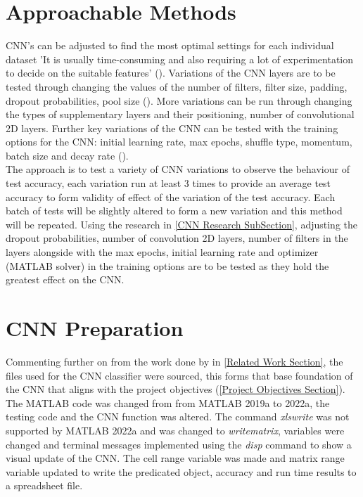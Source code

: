 \section{Approachable Methods}
\label{Approachable Methods Section}

CNN's can be adjusted to find the most optimal settings for each individual dataset 'It is usually time-consuming and also requiring a lot of experimentation to decide on the suitable features' (\cite{PalaniPaper}). Variations of the CNN layers are to be tested through changing the values of the number of filters, filter size, padding, dropout probabilities, pool size (\cite{layers}). More variations can be run through changing the types of supplementary layers and their positioning, number of convolutional 2D layers. Further key variations of the CNN can be tested with the training options for the CNN: initial learning rate, max epochs, shuffle type, momentum, batch size and decay rate (\cite{options}). \\

The approach is to test a variety of CNN variations to observe the behaviour of test accuracy, each variation run at least 3 times to provide an average test accuracy to form validity of effect of the variation of the test accuracy. Each batch of tests will be slightly altered to form a new variation and this method will be repeated. Using the research in \cref{CNN Research SubSection}, adjusting the dropout probabilities, number of convolution 2D layers, number of filters in the layers alongside with the max epochs, initial learning rate and optimizer (MATLAB solver) in the training options are to be tested as they hold the greatest effect on the CNN.

\section{CNN Preparation}
\label{CNN Preparation Section}

Commenting further on from the work done by \cite{PalaniPaper} in \cref{Related Work Section}, the files used for the CNN classifier were sourced, this forms that base foundation of the CNN that aligns with the project objectives (\cref{Project Objectives Section}). The MATLAB code was changed from from MATLAB 2019a to 2022a, the testing code and the CNN function was altered. The command \emph{xlswrite} was not supported by MATLAB 2022a and was changed to \emph{writematrix}, variables were changed and terminal messages implemented using the \emph{disp} command to show a visual update of the CNN. The cell range variable was made and matrix range variable updated to write the predicated object, accuracy and run time results to a spreadsheet file. 

